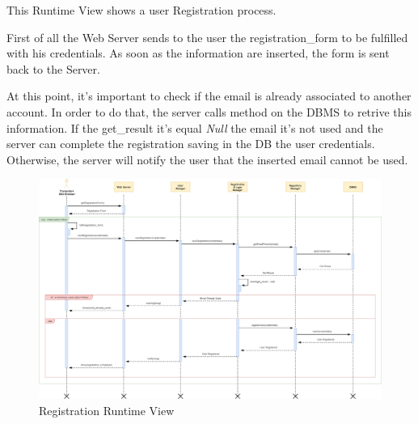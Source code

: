 This Runtime View shows a user Registration process.\par
First of all the Web Server sends to the user the registration\_form to be fulfilled with his credentials. As soon as the information are inserted, the form is sent back to the Server.\par
At this point, it’s important to check if the email is already associated to another account. In order to do that, the server calls method on the DBMS to retrive this information. If the get\_result it’s equal \emph{Null} the email it’s not used and the server can complete the registration saving in the DB the user credentials. Otherwise, the server will notify the user that the inserted email cannot be used.
\begin{figure}[H]
	\centering
	\includegraphics[scale=0.2]{Images/Runtime/Registration}
	\caption{Registration Runtime View}
\end{figure}

